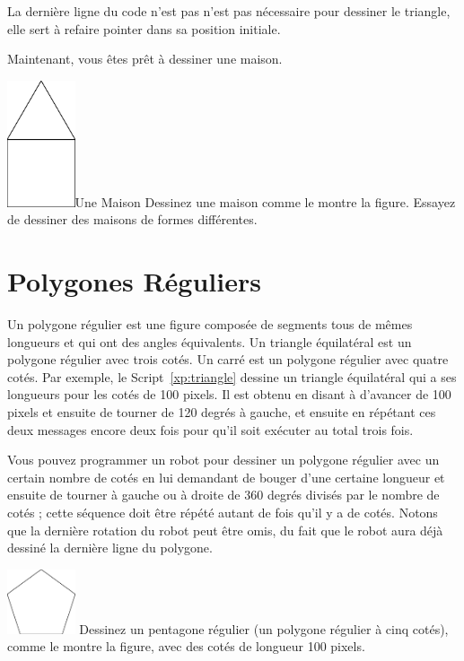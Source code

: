 \documentclass[a4paper,10pt,twoside]{book}
\begin{document}
La derni\`ere ligne du code n'est pas n'est pas n\'ecessaire pour dessiner le triangle, elle sert \`a refaire pointer 
 dans sa position initiale.

Maintenant, vous \^etes pr\^et \`a dessiner une maison. 

\begin{exofigwithsize}[0.5]{\includegraphics[width=2cm]{ChTurnbabyHouse}}{Une Maison}\label{xp:house}
	Dessinez une maison comme le montre la figure. Essayez de dessiner des maisons de formes diff\'erentes.
\end{exofigwithsize}


\section{Polygones R\'eguliers}

Un polygone r\'egulier est une figure compos\'ee de segments tous de m\^emes longueurs et qui ont des angles \'equivalents. 
Un triangle \'equilat\'eral est un polygone r\'egulier avec trois cot\'es. Un carr\'e est un polygone r\'egulier avec 
quatre cot\'es. Par exemple, le  Script~\ref{xp:triangle} dessine un triangle \'equilat\'eral qui a ses longueurs pour 
les cot\'es de 100 pixels. Il est obtenu en disant \`a  d'avancer de 100 pixels et ensuite de tourner 
de 120 degr\'es \`a gauche, et ensuite en r\'ep\'etant ces deux messages encore deux fois pour qu'il soit ex\'ecuter 
au total trois fois.

Vous pouvez programmer un robot pour dessiner un polygone r\'egulier avec un certain nombre de cot\'es en lui demandant 
de bouger d'une certaine longueur et ensuite de tourner \`a gauche ou \`a droite de 360 degr\'es divis\'es par le nombre de 
cot\'es ; cette s\'equence doit \^etre r\'ep\'et\'e autant de fois qu'il y a de cot\'es. Notons que la derni\`ere rotation du robot 
peut \^etre omis, du fait que le robot aura d\'ej\`a dessin\'e la derni\`ere ligne du polygone.


\begin{exofigwithsize}[0.5]{\includegraphics[width=2cm]{ChTurnpentagon}}{}\label{xp:penta}
	Dessinez un pentagone r\'egulier (un polygone r\'egulier \`a cinq cot\'es), comme le montre la figure, 
	avec des cot\'es de longueur 100 pixels.
\end{exofigwithsize}
\end{document}
